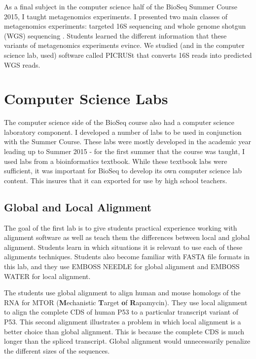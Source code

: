 \documentclass{report}
\begin{document}
As a final subject in the computer science half of the BioSeq Summer Course 2015, I taught metagenomics experiments. I presented two main classes of metagenomics experiments: targeted 16S sequencing \cite{qin2010human} and whole genome shotgun (WGS) sequencing \cite{chen2005bioinformatics}. Students learned the different information that these variants of metagenomics experiments evince. We studied (and in the computer science lab, used) software called PICRUSt \cite{langille2013predictive} that converts 16S reads into predicted WGS reads. 

\section{Computer Science Labs}
The computer science side of the BioSeq course also had a computer science laboratory component. I developed a number of labs to be used in conjunction with the Summer Course. These labs were mostly developed in the academic year leading up to Summer 2015 - for the first summer that the course was taught, I used labs from a bioinformatics textbook. While these textbook labs were sufficient, it was important for BioSeq to develop its own computer science lab content. This insures that it can exported for use by high school teachers.


\subsection{Global and Local Alignment}
The goal of the first lab is to give students practical experience working with alignment software as well as teach them the differences between local and global alignment. Students learn in which situations it is relevant to use each of these alignments techniques. Students also become familiar with FASTA file formats in this lab, and they use EMBOSS NEEDLE for global alignment and EMBOSS WATER for local alignment.

The students use global alignment to align human and mouse homologs of the RNA for MTOR (\textbf{M}echanistic \textbf{T}arget \textbf{o}f \textbf{R}apamycin). They use local alignment to align the complete CDS of human P53 to a particular transcript variant of P53. This second alignment illustrates a problem in which local alignment is a better choice than global alignment. This is because the complete CDS is much longer than the spliced transcript. Global alignment would unnecessarily penalize the different sizes of the sequences. 
\end{document}
